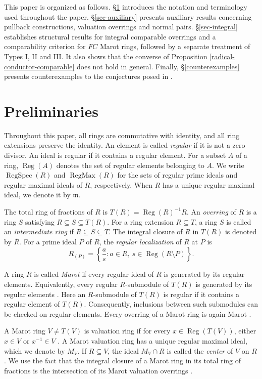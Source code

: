 \documentclass[12pt]{article}
\newcommand{\Reg}{\operatorname{Reg}}
\newcommand{\RegMax}{\operatorname{RegMax}}
\newcommand{\RegSpec}{\operatorname{RegSpec}}
\begin{document}
	This paper is organized as follows. \S \ref{sec-preliminaries} introduces the notation and terminology used throughout the paper. \S \ref{sec-auxiliary} presents auxiliary results concerning pullback constructions, valuation overrings and normal pairs. \S \ref{sec-integral} establishes structural results for integral comparable overrings and a comparability criterion for $FC$ Marot rings, followed by a separate treatment of Types I, II and III. It also shows that the converse of Proposition \ref{radical-conductor-comparable} does not hold in general. Finally, \S \ref{counterexamples} presents counterexamples to the conjectures posed in \cite[Problems 29 and 30]{ayache}.
\section{Preliminaries}\label{sec-preliminaries}
	
	Throughout this paper, all rings are commutative with identity, and all ring extensions preserve the identity. An element is called \emph{regular} if it is not a zero divisor. An ideal is regular if it contains a regular element. For a subset $A$ of a ring, $\Reg(A)$ denotes the set of regular elements belonging to $A$. We write $\RegSpec(R)$ and $\RegMax(R)$ for the sets of regular prime ideals and regular maximal ideals of $R$, respectively. When $R$ has a unique regular maximal ideal, we denote it by $\mathfrak{m}$.
	
	The total ring of fractions of $R$ is $T(R)=\Reg(R)^{-1}R$. An \emph{overring} of $R$ is a ring $S$ satisfying $R\subseteq S\subseteq T(R)$. For a ring extension $R\subseteq T$, a ring $S$ is called an \emph{intermediate ring} if $R\subseteq S\subseteq T$. The integral closure of $R$ in $T(R)$ is denoted by $\overline R$. For a prime ideal $P$ of $R$, the \emph{regular localization} of $R$ at $P$ is
	\[ R_{(P)}	= \left\{\frac{a}{s}:a\in R,\ s\in\Reg(R\setminus P)\right\}.\]
	
	A ring $R$ is called \emph{Marot} if every regular ideal of $R$ is generated by its regular elements. Equivalently, every regular $R$-submodule of $T(R)$ is generated by its regular elements \cite[Theorem 7.1]{huckaba}. Here an $R$-submodule of $T(R)$ is regular if it contains a regular element of $T(R)$. Consequently, inclusions between such submodules can be checked on regular elements. Every overring of a Marot ring is again Marot \cite[Corollary 7.3]{huckaba}.
	
	A Marot ring $V\neq T(V)$ is valuation ring if for every $x\in\Reg(T(V))$, either $x\in V$ or $x^{-1}\in V$ \cite[Theorem 7.7]{huckaba}. A Marot valuation ring has a unique regular maximal ideal, which we denote by $M_V$. If $R\subseteq V$, the ideal $M_V\cap R$ is called the \emph{center} of $V$ on $R$. We use the fact that the integral closure of a Marot ring in its total ring of fractions is the intersection of its Marot valuation overrings \cite[Theorem 9.3]{huckaba}. 
	
\end{document}
